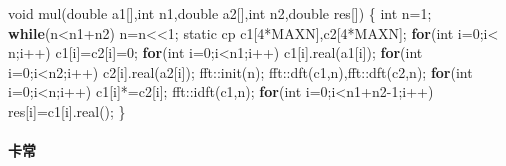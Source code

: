 \documentclass[
]{article}
\newenvironment{Shaded}{}{}
\newcommand{\AttributeTok}[1]{\textcolor[rgb]{0.49,0.56,0.16}{#1}}
\newcommand{\ControlFlowTok}[1]{\textcolor[rgb]{0.00,0.44,0.13}{\textbf{#1}}}
\newcommand{\DataTypeTok}[1]{\textcolor[rgb]{0.56,0.13,0.00}{#1}}
\newcommand{\DecValTok}[1]{\textcolor[rgb]{0.25,0.63,0.44}{#1}}
\newcommand{\NormalTok}[1]{#1}
\begin{document}
\begin{Shaded}
\begin{Highlighting}[]
\DataTypeTok{void}\NormalTok{ mul(}\DataTypeTok{double}\NormalTok{ a1[],}\DataTypeTok{int}\NormalTok{ n1,}\DataTypeTok{double}\NormalTok{ a2[],}\DataTypeTok{int}\NormalTok{ n2,}\DataTypeTok{double}\NormalTok{ res[])}
\NormalTok{\{}
    \DataTypeTok{int}\NormalTok{ n=}\DecValTok{1}\NormalTok{;}
    \ControlFlowTok{while}\NormalTok{(n\textless{}n1+n2) n=n\textless{}\textless{}}\DecValTok{1}\NormalTok{;}
    \AttributeTok{static}\NormalTok{ cp c1[}\DecValTok{4}\NormalTok{*MAXN],c2[}\DecValTok{4}\NormalTok{*MAXN];}
    \ControlFlowTok{for}\NormalTok{(}\DataTypeTok{int}\NormalTok{ i=}\DecValTok{0}\NormalTok{;i\textless{} n;i++) c1[i]=c2[i]=}\DecValTok{0}\NormalTok{;}
    \ControlFlowTok{for}\NormalTok{(}\DataTypeTok{int}\NormalTok{ i=}\DecValTok{0}\NormalTok{;i\textless{}n1;i++) c1[i].real(a1[i]);}
    \ControlFlowTok{for}\NormalTok{(}\DataTypeTok{int}\NormalTok{ i=}\DecValTok{0}\NormalTok{;i\textless{}n2;i++) c2[i].real(a2[i]);}
\NormalTok{    fft::init(n);}
\NormalTok{    fft::dft(c1,n),fft::dft(c2,n);}
    \ControlFlowTok{for}\NormalTok{(}\DataTypeTok{int}\NormalTok{ i=}\DecValTok{0}\NormalTok{;i\textless{}n;i++) c1[i]*=c2[i];}
\NormalTok{    fft::idft(c1,n);}
    \ControlFlowTok{for}\NormalTok{(}\DataTypeTok{int}\NormalTok{ i=}\DecValTok{0}\NormalTok{;i\textless{}n1+n2{-}}\DecValTok{1}\NormalTok{;i++)}
\NormalTok{        res[i]=c1[i].real();}
\NormalTok{\}}
\end{Highlighting}
\end{Shaded}

\hypertarget{ux5361ux5e38}{%
\paragraph{卡常}\label{ux5361ux5e38}}
\end{document}
